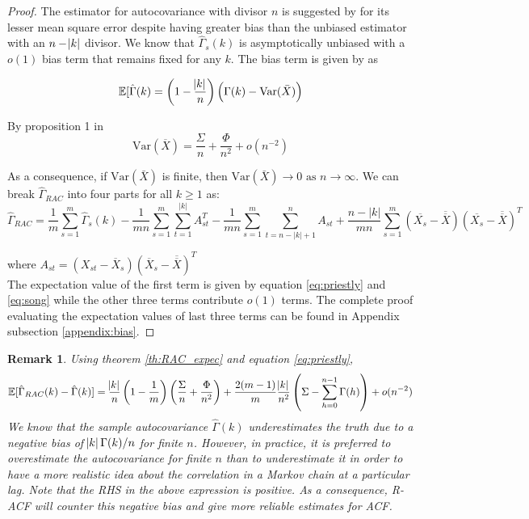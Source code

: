 \documentclass[12pt]{article}
\newcommand{\Var}{\text{Var}}
\newtheorem{remark}{Remark}
\begin{document}
\begin{proof}
 The estimator for autocovariance with divisor $n$ is suggested by \cite{parzen1961approach} for its lesser mean square error despite having greater bias than the unbiased estimator with an $n - \abs{k}$ divisor. 
 We know that $\hat{\Gamma}_s(k)$ is asymptotically unbiased with a $o(1)$ bias term that remains fixed for any $k$. The bias term is given by \cite{priestley1981spectral} as 
 
 \begin{equation} \label{eq:priestly}
     \mathbb{E}[\hat{\Gamma}(k) = \left(1- \dfrac{\abs{k}}{n}\right)\left(\Gamma(k) - \Var{(\bar{X})}
 \right)
 \end{equation}
 
By proposition 1 in \cite{song1995optimal} 
\begin{equation} \label{eq:song}
\Var(\overline{X}) = \dfrac{\Sigma}{n} + \dfrac{\Phi}{n^2} + o(n^{-2})
\end{equation}

As a consequence, if $\Var(\bar{X})$ is finite, then $\Var(\bar{X}) \to 0 \textrm{ as } n \to \infty$. We can break $\hat{\Gamma}_{RAC}$ into four parts for all $k \geq 1$ as:
 \[
 \hat{\Gamma}_{RAC} =  \dfrac{1}{m}\sum_{s=1}^{m}\hat{\Gamma}_s(k) - \dfrac{1}{mn}\sum_{s=1}^{m}\sum_{t=1}^{|k|}A_{st}^T - \dfrac{1}{mn}\sum_{s=1}^{m}\sum_{t=n-|k|+1}^{n}A_{st} + \dfrac{n-|k|}{mn}\sum_{s=1}^{m}(\overline{X_s}-\overline{\overline{X}})(\overline{X_s}-\overline{\overline{X}})^T
 \]
 
where $A_{st} = (X_{st}-\overline{X}_s)(\overline{X}_s - \overline{\overline{X}})^T$\\
The expectation value of the first term is given by equation \ref{eq:priestly} and \ref{eq:song} while the other three terms contribute $o(1)$ terms. The complete proof evaluating the expectation values of last three terms can be found in Appendix subsection \ref{appendix:bias}.
\end{proof}

\begin{remark} \label{rmrk:exp_racf_minus_acf}
Using theorem \ref{th:RAC_expec} and equation \ref{eq:priestly},
\[
\mathbb{E}[\hat{\Gamma}_{RAC}(k) - \hat{\Gamma}(k)] = \dfrac{\abs{k}}{n}\left(1 - \dfrac{1}{m}\right)\left(\dfrac{\Sigma}{n} + \dfrac{\Phi}{n^2}\right) + \dfrac{2(m-1)}{m}\dfrac{\abs{k}}{n^2} \left(\Sigma - \sum_{h=0}^{n-1}\Gamma(h)\right) + o(n^{-2})
\]
We know that the sample autocovariance $\hat{\Gamma}(k)$ underestimates the truth due to a negative bias of $\abs{k}\Gamma(k)/n$ for finite $n$. However, in practice, it is preferred to overestimate the autocovariance for finite $n$ than to underestimate it in order to have a more realistic idea about the correlation in a Markov chain at a particular lag.  Note that the RHS in the above expression is positive. As a consequence, R-ACF will counter this negative bias and give more reliable estimates for ACF. 

\end{remark}
\end{document}
